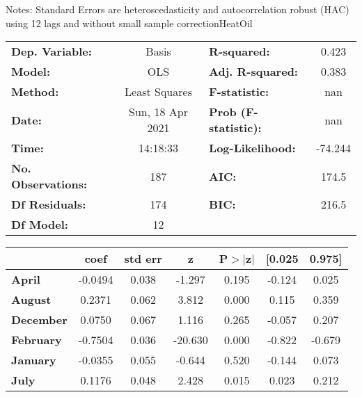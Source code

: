 Notes: \newline
 [1] Standard Errors are heteroscedasticity and autocorrelation robust (HAC) using 12 lags and without small sample correctionHeatOil\begin{center}
\begin{tabular}{lclc}
\toprule
\textbf{Dep. Variable:}    &      Basis       & \textbf{  R-squared:         } &     0.423   \\
\textbf{Model:}            &       OLS        & \textbf{  Adj. R-squared:    } &     0.383   \\
\textbf{Method:}           &  Least Squares   & \textbf{  F-statistic:       } &       nan   \\
\textbf{Date:}             & Sun, 18 Apr 2021 & \textbf{  Prob (F-statistic):} &      nan    \\
\textbf{Time:}             &     14:18:33     & \textbf{  Log-Likelihood:    } &   -74.244   \\
\textbf{No. Observations:} &         187      & \textbf{  AIC:               } &     174.5   \\
\textbf{Df Residuals:}     &         174      & \textbf{  BIC:               } &     216.5   \\
\textbf{Df Model:}         &          12      & \textbf{                     } &             \\
\bottomrule
\end{tabular}
\begin{tabular}{lcccccc}
                   & \textbf{coef} & \textbf{std err} & \textbf{z} & \textbf{P$> |$z$|$} & \textbf{[0.025} & \textbf{0.975]}  \\
\midrule
\textbf{April}     &      -0.0494  &        0.038     &    -1.297  &         0.195        &       -0.124    &        0.025     \\
\textbf{August}    &       0.2371  &        0.062     &     3.812  &         0.000        &        0.115    &        0.359     \\
\textbf{December}  &       0.0750  &        0.067     &     1.116  &         0.265        &       -0.057    &        0.207     \\
\textbf{February}  &      -0.7504  &        0.036     &   -20.630  &         0.000        &       -0.822    &       -0.679     \\
\textbf{January}   &      -0.0355  &        0.055     &    -0.644  &         0.520        &       -0.144    &        0.073     \\
\textbf{July}      &       0.1176  &        0.048     &     2.428  &         0.015        &        0.023    &        0.212     \\

\end{tabular}
\end{center}
